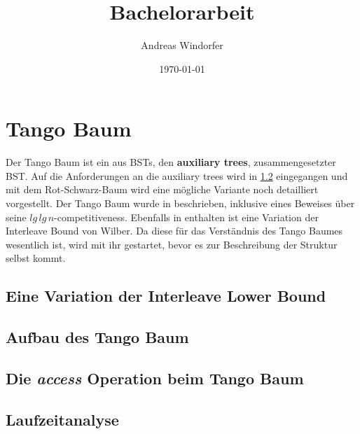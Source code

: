 \documentclass[a4paper,12pt]{article}
\title{Bachelorarbeit}
\author{
Andreas Windorfer\\
}
\date{\today}
\begin{document}
\maketitle
\newpage

\tableofcontents
\newpage

\section{Tango Baum}
Der Tango Baum ist ein aus BSTs, den \textbf{auxiliary trees}, zusammengesetzter BST. Auf die Anforderungen an die auxiliary trees wird in \ref{aufbauDesTango} eingegangen und mit dem Rot-Schwarz-Baum wird eine mögliche Variante noch detailliert vorgestellt. Der Tango Baum wurde in \cite{demainDinamicOpti} beschrieben, inklusive eines Beweises über seine $\mathit{lg} \, \mathit{lg} \, n $-competitiveness. Ebenfalls in \cite{demainDinamicOpti} enthalten ist eine Variation der Interleave Bound von Wilber. Da diese für das Verständnis des Tango Baumes wesentlich ist, wird mit ihr gestartet, bevor es zur Beschreibung der Struktur selbst kommt. 


\subsection{Eine Variation der Interleave Lower Bound}
\subsection{Aufbau des Tango Baum} \label{aufbauDesTango}
\subsection{Die \textit{access} Operation beim Tango Baum}
\subsection{Laufzeitanalyse}
\newpage


\end{document}
